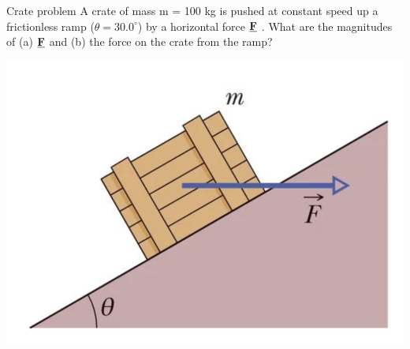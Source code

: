 \begin{frame}{Crate problem}
\scriptsize
A crate of mass m = 100 kg is pushed at constant speed up a frictionless ramp ($\theta = 30.0^{\circ}$) by a horizontal force $\underline{\mathbf{F}}$ . What are the magnitudes of (a) $\underline{\mathbf{F}}$ and (b) the force on the crate from the ramp?

\includegraphics[scale=0.3]{crate2}
\vspace{4cm}
\end{frame}


